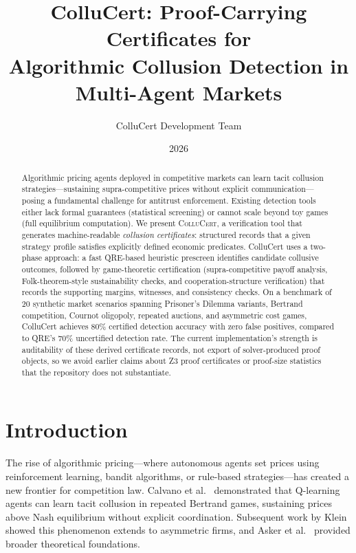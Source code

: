 \documentclass[11pt]{article}
\title{ColluCert: Proof-Carrying Certificates for\\Algorithmic Collusion Detection in Multi-Agent Markets}
\author{ColluCert Development Team}
\date{2026}
\begin{document}
\maketitle

\begin{abstract}
Algorithmic pricing agents deployed in competitive markets can learn tacit collusion strategies---sustaining supra-competitive prices without explicit communication---posing a fundamental challenge for antitrust enforcement. Existing detection tools either lack formal guarantees (statistical screening) or cannot scale beyond toy games (full equilibrium computation). We present \textsc{ColluCert}, a verification tool that generates machine-readable \emph{collusion certificates}: structured records that a given strategy profile satisfies explicitly defined economic predicates. ColluCert uses a two-phase approach: a fast QRE-based heuristic prescreen identifies candidate collusive outcomes, followed by game-theoretic certification (supra-competitive payoff analysis, Folk-theorem-style sustainability checks, and cooperation-structure verification) that records the supporting margins, witnesses, and consistency checks. On a benchmark of 20 synthetic market scenarios spanning Prisoner's Dilemma variants, Bertrand competition, Cournot oligopoly, repeated auctions, and asymmetric cost games, ColluCert achieves 80\% certified detection accuracy with zero false positives, compared to QRE's 70\% uncertified detection rate. The current implementation's strength is auditability of these derived certificate records, not export of solver-produced proof objects, so we avoid earlier claims about Z3 proof certificates or proof-size statistics that the repository does not substantiate.
\end{abstract}

\section{Introduction}
\label{sec:intro}

The rise of algorithmic pricing---where autonomous agents set prices using reinforcement learning, bandit algorithms, or rule-based strategies---has created a new frontier for competition law. Calvano et al.~\cite{calvano2020} demonstrated that Q-learning agents can learn tacit collusion in repeated Bertrand games, sustaining prices above Nash equilibrium without explicit coordination. Subsequent work by Klein~\cite{klein2021} showed this phenomenon extends to asymmetric firms, and Asker et al.~\cite{asker2022} provided broader theoretical foundations.
\end{document}
